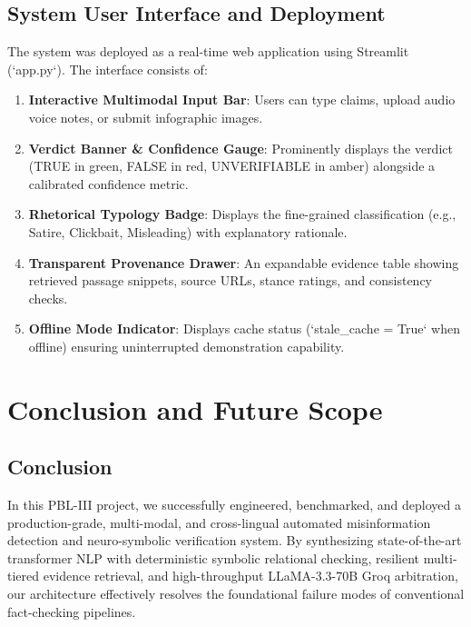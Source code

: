 \documentclass[12pt,a4paper]{report}
\begin{document}
\section{System User Interface and Deployment}
The system was deployed as a real-time web application using Streamlit (`app.py`). The interface consists of:
\begin{enumerate}
    \item \textbf{Interactive Multimodal Input Bar}: Users can type claims, upload audio voice notes, or submit infographic images.
    \item \textbf{Verdict Banner \& Confidence Gauge}: Prominently displays the verdict (TRUE in green, FALSE in red, UNVERIFIABLE in amber) alongside a calibrated confidence metric.
    \item \textbf{Rhetorical Typology Badge}: Displays the fine-grained classification (e.g., Satire, Clickbait, Misleading) with explanatory rationale.
    \item \textbf{Transparent Provenance Drawer}: An expandable evidence table showing retrieved passage snippets, source URLs, stance ratings, and consistency checks.
    \item \textbf{Offline Mode Indicator}: Displays cache status (`stale\_cache = True` when offline) ensuring uninterrupted demonstration capability.
\end{enumerate}

\chapter{Conclusion and Future Scope}

\section{Conclusion}
In this PBL-III project, we successfully engineered, benchmarked, and deployed a production-grade, multi-modal, and cross-lingual automated misinformation detection and neuro-symbolic verification system. By synthesizing state-of-the-art transformer NLP with deterministic symbolic relational checking, resilient multi-tiered evidence retrieval, and high-throughput LLaMA-3.3-70B Groq arbitration, our architecture effectively resolves the foundational failure modes of conventional fact-checking pipelines.
\end{document}
